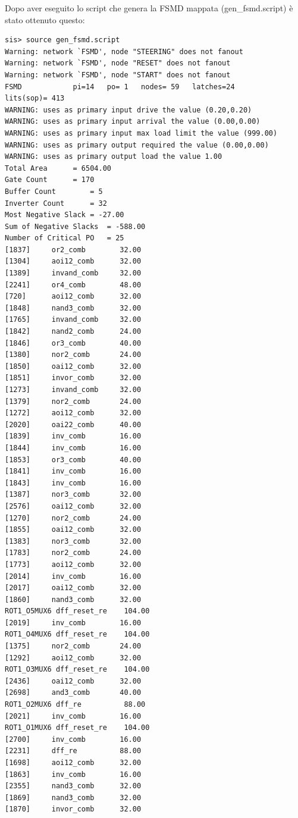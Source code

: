 \documentclass[a4paper,titlepage]{book}
\begin{document}
Dopo aver eseguito lo script che genera la FSMD mappata (gen\_fsmd.script) è stato ottenuto questo:

\begin{lstlisting}
sis> source gen_fsmd.script
Warning: network `FSMD', node "STEERING" does not fanout
Warning: network `FSMD', node "RESET" does not fanout
Warning: network `FSMD', node "START" does not fanout
FSMD          	pi=14	po= 1	nodes= 59	latches=24
lits(sop)= 413
WARNING: uses as primary input drive the value (0.20,0.20)
WARNING: uses as primary input arrival the value (0.00,0.00)
WARNING: uses as primary input max load limit the value (999.00)
WARNING: uses as primary output required the value (0.00,0.00)
WARNING: uses as primary output load the value 1.00
Total Area		= 6504.00
Gate Count		= 170
Buffer Count		= 5
Inverter Count 		= 32
Most Negative Slack	= -27.00
Sum of Negative Slacks	= -588.00
Number of Critical PO	= 25
[1837]     or2_comb        32.00	
[1304]     aoi12_comb      32.00	
[1389]     invand_comb     32.00	
[2241]     or4_comb        48.00	
[720]      aoi12_comb      32.00	
[1848]     nand3_comb      32.00	
[1765]     invand_comb     32.00	
[1842]     nand2_comb      24.00	
[1846]     or3_comb        40.00	
[1380]     nor2_comb       24.00	
[1850]     oai12_comb      32.00	
[1851]     invor_comb      32.00	
[1273]     invand_comb     32.00	
[1379]     nor2_comb       24.00	
[1272]     aoi12_comb      32.00	
[2020]     oai22_comb      40.00	
[1839]     inv_comb        16.00	
[1844]     inv_comb        16.00	
[1853]     or3_comb        40.00	
[1841]     inv_comb        16.00	
[1843]     inv_comb        16.00	
[1387]     nor3_comb       32.00	
[2576]     oai12_comb      32.00	
[1270]     nor2_comb       24.00	
[1855]     oai12_comb      32.00	
[1383]     nor3_comb       32.00	
[1783]     nor2_comb       24.00	
[1773]     aoi12_comb      32.00	
[2014]     inv_comb        16.00	
[2017]     oai12_comb      32.00	
[1860]     nand3_comb      32.00	
ROT1_O5MUX6 dff_reset_re    104.00	
[2019]     inv_comb        16.00	
ROT1_O4MUX6 dff_reset_re    104.00	
[1375]     nor2_comb       24.00	
[1292]     aoi12_comb      32.00	
ROT1_O3MUX6 dff_reset_re    104.00	
[2436]     oai12_comb      32.00	
[2698]     and3_comb       40.00	
ROT1_O2MUX6 dff_re          88.00	
[2021]     inv_comb        16.00	
ROT1_O1MUX6 dff_reset_re    104.00	
[2700]     inv_comb        16.00	
[2231]     dff_re          88.00	
[1698]     aoi12_comb      32.00	
[1863]     inv_comb        16.00	
[2355]     nand3_comb      32.00	
[1869]     nand3_comb      32.00	
[1870]     invor_comb      32.00	

\end{lstlisting}
\end{document}
